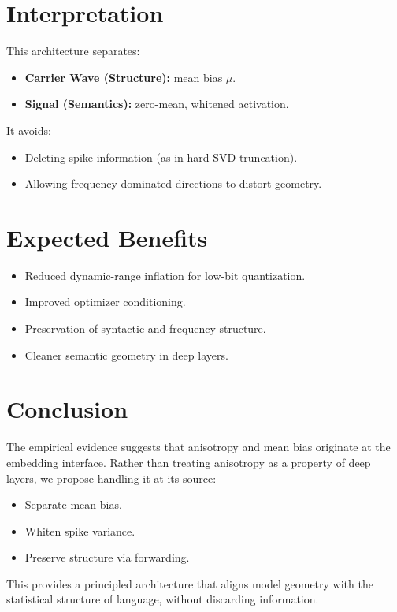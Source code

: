 \documentclass[11pt]{article}
\begin{document}
\section{Interpretation}

This architecture separates:

\begin{itemize}
    \item \textbf{Carrier Wave (Structure):} mean bias $\mu$.
    \item \textbf{Signal (Semantics):} zero-mean, whitened activation.
\end{itemize}

It avoids:

\begin{itemize}
    \item Deleting spike information (as in hard SVD truncation).
    \item Allowing frequency-dominated directions to distort geometry.
\end{itemize}

\section{Expected Benefits}

\begin{itemize}
    \item Reduced dynamic-range inflation for low-bit quantization.
    \item Improved optimizer conditioning.
    \item Preservation of syntactic and frequency structure.
    \item Cleaner semantic geometry in deep layers.
\end{itemize}

\section{Conclusion}

The empirical evidence suggests that anisotropy and mean bias originate at the embedding interface.
Rather than treating anisotropy as a property of deep layers, we propose handling it at its source:

\begin{itemize}
    \item Separate mean bias.
    \item Whiten spike variance.
    \item Preserve structure via forwarding.
\end{itemize}

This provides a principled architecture that aligns model geometry with the statistical structure of language, without discarding information.
\end{document}
